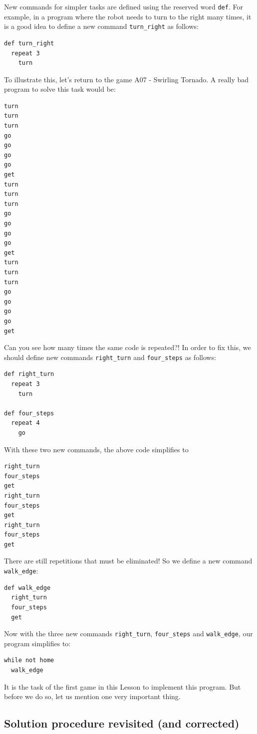 \documentclass[article,A4,12pt]{llncs}
\begin{document}
\noindent
New commands for simpler tasks are defined using the reserved word 
{\tt def}. For example, in a program where the robot needs to turn to the 
right many times, it is a good idea to define a new command {\tt turn\_right}
as follows:

\begin{verbatim}
def turn_right
  repeat 3
    turn
\end{verbatim}
To illustrate this, let's return to the game A07 - Swirling Tornado.
A really bad program to solve this task would be:

{\small
\begin{verbatim}
turn
turn
turn
go
go
go
go 
get
turn
turn
turn
go
go
go
go 
get
turn
turn
turn
go
go
go
go
get
\end{verbatim}
}
\noindent
Can you see how many times the same code is repeated?! In order to fix this, 
we should define new commands {\tt right\_turn} and {\tt four\_steps} as
follows:

{\small
\begin{verbatim}
def right_turn
  repeat 3
    turn

def four_steps
  repeat 4
    go
\end{verbatim}
}
\noindent
With these two new commands, the above code simplifies to 

{\small
\begin{verbatim}
right_turn
four_steps
get
right_turn
four_steps
get
right_turn
four_steps
get
\end{verbatim}
}
\noindent
There are still repetitions that must be eliminated! So we define a new command 
{\tt walk\_edge}:

{\small
\begin{verbatim}
def walk_edge
  right_turn
  four_steps
  get
\end{verbatim}
}
\noindent
Now with the three new commands {\tt right\_turn}, {\tt four\_steps} and
{\tt walk\_edge}, our program simplifies to:

{\small
\begin{verbatim}
while not home
  walk_edge
\end{verbatim}
}
\noindent
It is the task of the first game in this Lesson to implement this program. But before we 
do so, let us mention one very important thing.

\subsection{Solution procedure revisited (and corrected)}
\end{document}
